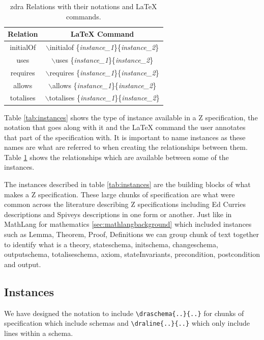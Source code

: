 \begin{table}[H]
\begin{tabular}{| c | c |}
\hline
\textbf{Relation} &  \textbf{\LaTeX{} Command} \\
\hline
initialOf &  $\backslash$initialof
\{\textit{instance\_1}\}\{\textit{instance\_2}\}  \\
\hline
uses & $\backslash$uses \{\textit{instance\_1}\}\{\textit{instance\_2}\}\\
\hline
requires & $\backslash$requires
\{\textit{instance\_1}\}\{\textit{instance\_2}\}\\
\hline
allows & $\backslash$allows \{\textit{instance\_1}\}\{\textit{instance\_2}\}\\
\hline
totalises & $\backslash$totalises
\{\textit{instance\_1}\}\{\textit{instance\_2}\}\\
\hline
\end{tabular}
\caption{\label{tab:relations} \gls{zdra} Relations with their notations and \LaTeX{} commands.}
\end{table}

Table \ref{tab:instances} shows the type of instance available in a Z
specification, the notation that goes along with it and the \LaTeX{} command the
user annotates that part of the specification with. It is important to name
instances as these names are what are referred to when creating the
relationships between them. Table \ref{tab:relations} shows the relationships
which are available between some of the instances. 

The instances described in table \ref{tab:instances} are the building blocks of
what makes a Z specification. These large chunks of specification are what were
common across the literature describing Z specifications including Ed Curries descriptions \cite{essenceofz} and Spiveys descriptions
\cite{spiveyreferencemanual} in one form or another. Just like in MathLang for
mathematics \ref{sec:mathlangbackground} which included instances such as Lemma,
Theorem, Proof, Definitions we can group chunk of text together to identify what
is a theory, stateschema, initschema, changeschema, outputschema,
totaliseschema, axiom, stateInvariants, precondition, postcondition and output.

\subsection{Instances}

We have designed the notation to include \verb|\draschema{..}{..}| for chunks of
specification which include schemas and \verb|\draline{..}{..}| which only
include lines within a schema.

